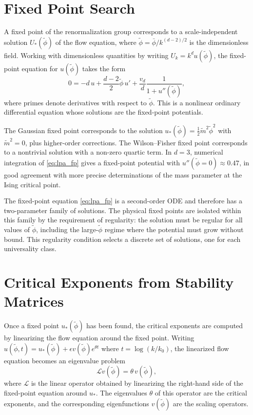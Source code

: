 \documentclass[11pt, twoside, openright]{book}
\theoremstyle{dotted}
\theoremstyle{definition}
\begin{document}
\section{Fixed Point Search}

A fixed point of the renormalization group corresponds to a scale-independent
solution $U_*(\tilde\phi)$ of the flow equation, where $\tilde\phi = \bar\phi/k^{(d-2)/2}$
is the dimensionless field. Working with dimensionless quantities by writing
$U_k = k^d u(\tilde\phi)$, the fixed-point equation for $u(\tilde\phi)$ takes the form
\begin{equation}
  0 = -d \, u + \frac{d-2}{2}\tilde\phi \, u' + \frac{v_d}{d} \frac{1}{1 + u''(\tilde\phi)},
  \label{eq:lpa_fp}
\end{equation}
where primes denote derivatives with respect to $\tilde\phi$. This is a nonlinear
ordinary differential equation whose solutions are the fixed-point potentials.

The Gaussian fixed point corresponds to the solution $u_*(\tilde\phi) = \frac{1}{2}\tilde m^2\tilde\phi^2$
with $\tilde m^2 = 0$, plus higher-order corrections. The Wilson--Fisher fixed point
corresponds to a nontrivial solution with a non-zero quartic term. In $d = 3$,
numerical integration of \eqref{eq:lpa_fp} gives a fixed-point potential with
$u''(\tilde\phi = 0) \approx 0.47$, in good agreement with more precise determinations
of the mass parameter at the Ising critical point.

The fixed-point equation \eqref{eq:lpa_fp} is a second-order ODE and therefore has
a two-parameter family of solutions. The physical fixed points are isolated within
this family by the requirement of regularity: the solution must be regular for all
values of $\tilde\phi$, including the large-$\tilde\phi$ regime where the potential
must grow without bound. This regularity condition selects a discrete set of
solutions, one for each universality class.

\section{Critical Exponents from Stability Matrices}

Once a fixed point $u_*(\tilde\phi)$ has been found, the critical exponents are
computed by linearizing the flow equation around the fixed point. Writing
$u(\tilde\phi, t) = u_*(\tilde\phi) + \epsilon v(\tilde\phi) e^{\theta t}$
where $t = \log(k/k_0)$, the linearized flow equation becomes an eigenvalue problem
\begin{equation}
  \mathcal{L} v(\tilde\phi) = \theta \, v(\tilde\phi),
  \label{eq:eigenvalue_problem}
\end{equation}
where $\mathcal{L}$ is the linear operator obtained by linearizing the right-hand
side of the fixed-point equation around $u_*$. The eigenvalues $\theta$ of this
operator are the critical exponents, and the corresponding eigenfunctions $v(\tilde\phi)$
are the scaling operators.
\end{document}

